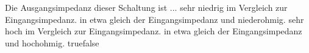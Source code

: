     {Die Ausgangsimpedanz dieser Schaltung ist ...}
    {sehr niedrig im Vergleich zur Eingangsimpedanz.}
    {in etwa gleich der Eingangsimpedanz und niederohmig.}
    {sehr hoch im Vergleich zur Eingangsimpedanz.}
    {in etwa gleich der Eingangsimpedanz und hochohmig.}
    {true}{false}